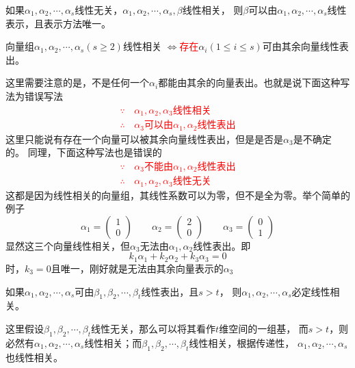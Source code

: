 \begin{theorem}
    如果$\alpha_1,\alpha_2,\cdots,\alpha_s$线性无关，$\alpha_1,\alpha_2,\cdots,\alpha_s,\beta$线性相关，
    则$\beta$可以由$\alpha_1,\alpha_2,\cdots,\alpha_s$线性表示，且表示方法唯一。
\end{theorem}
\begin{theorem}
    向量组$\alpha_1,\alpha_2,\cdots,\alpha_s(s\geq 2)$线性相关
    $\iff$\textcolor{red}{存在}$\alpha_i(1\leq i \leq s)$可由其余向量线性表出。
\end{theorem}
这里需要注意的是，不是任何一个$\alpha_i$都能由其余的向量表出。也就是说下面这种写法为错误写法
\textcolor{red}{
    \begin{align*}
        \because   \, & \alpha_1,\alpha_2,\alpha_3\text{线性相关}              \\
        \therefore \, & \alpha_3 \text{可以由}\alpha_1,\alpha_2\text{线性表出}
    \end{align*}
}
这里只能说有存在一个向量可以被其余向量线性表出，但是是否是$\alpha_3$是不确定的。
同理，下面这种写法也是错误的
\textcolor{red}{
    \begin{align*}
        \because   \, & \alpha_3 \text{不能由}\alpha_1,\alpha_2 \text{线性表出} \\
        \therefore \, & \alpha_1,\alpha_2,\alpha_3 \text{线性无关}
    \end{align*}
}
这都是因为线性相关的向量组，其线性系数可以为零，但不是全为零。举个简单的例子
\[
    \alpha_1 =
    \begin{pmatrix}
        1 \\0
    \end{pmatrix}
    \qquad
    \alpha_2 =
    \begin{pmatrix}
        2 \\0
    \end{pmatrix}
    \qquad
    \alpha_3 =
    \begin{pmatrix}
        0 \\1
    \end{pmatrix}
\]
显然这三个向量线性相关，但$\alpha_3$无法由$\alpha_1,\alpha_2$线性表出。即
\[ k_1\alpha_1 + k_2\alpha_2 + k_3\alpha_3 = 0 \]
时，$k_3=0$且唯一，刚好就是无法由其余向量表示的$\alpha_3$

\begin{theorem}
    如果$\alpha_1,\alpha_2,\cdots,\alpha_s$可由$\beta_1,\beta_2,\cdots,\beta_t$线性表出，且$s>t$，
    则$\alpha_1,\alpha_2,\cdots,\alpha_s$必定线性相关。
\end{theorem}
这里假设$\beta_1,\beta_2,\cdots,\beta_t$线性无关，那么可以将其看作$t$维空间的一组基，
而$s>t$，则必然有$\alpha_1,\alpha_2,\cdots,\alpha_s$线性相关；而$\beta_1,\beta_2,\cdots,\beta_t$线性相关，根据传递性，
$\alpha_1,\alpha_2,\cdots,\alpha_s$也线性相关。

